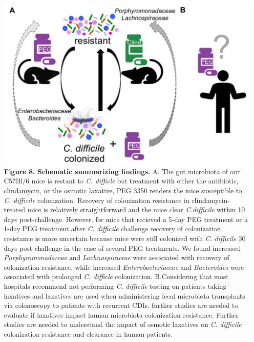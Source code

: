 \documentclass[
  11pt,
]{article}
\begin{document}
\includegraphics{figure_8.pdf} \textbf{Figure 8. Schematic summarizing
findings.} A. The gut microbiota of our C57Bl/6 mice is restant to
\emph{C. difficle} but treatment with either the antibiotic,
clindamycin, or the osmotic laxative, PEG 3350 renders the mice
susceptible to \emph{C. difficile} colonization. Recovery of
colonization resistance in clindamycin-treated mice is relatively
straightforward and the mice clear \emph{C.difficile} within 10 days
post-challenge. However, for mice that recieved a 5-day PEG treatment or
a 1-day PEG treatment after \emph{C. difficile} challenge recovery of
colonization resistance is more uncertain because mice were still
colonized with \emph{C. difficile} 30 days post-challenge in the case of
several PEG treatments. We found increased \emph{Porphyromonadaceae} and
\emph{Lachnospiraceae} were associated with recovery of colonization
resistance, while increased \emph{Enterobacteriaceae} and
\emph{Bacteroides} were associated with prolonged \emph{C. difficle}
colonization. B.Considering that most hospitals recommend not performing
\emph{C. difficile} testing on patients taking laxatives and laxatives
are used when administering fecal microbiota transplants via colonoscopy
to patients with recurrent CDIs. further studies are needed to evaluate
if laxatives impact human microbiota colonization resistance. Further
studies are needed to understand the impact of osmotic laxatives on
\emph{C. difficile} colonization resistance and clearance in human
patients. \newpage
\end{document}
